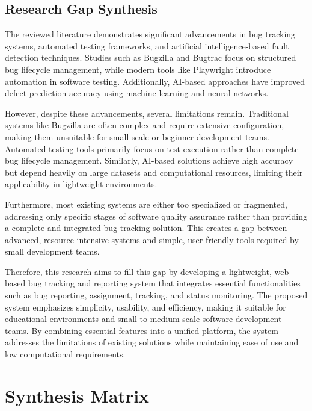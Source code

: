 \documentclass[12pt]{article}
\begin{document}
\subsection{Research Gap Synthesis}

The reviewed literature demonstrates significant advancements in bug tracking systems, automated testing frameworks, and artificial intelligence-based fault detection techniques. Studies such as Bugzilla and Bugtrac focus on structured bug lifecycle management, while modern tools like Playwright introduce automation in software testing. Additionally, AI-based approaches have improved defect prediction accuracy using machine learning and neural networks.

However, despite these advancements, several limitations remain. Traditional systems like Bugzilla are often complex and require extensive configuration, making them unsuitable for small-scale or beginner development teams. Automated testing tools primarily focus on test execution rather than complete bug lifecycle management. Similarly, AI-based solutions achieve high accuracy but depend heavily on large datasets and computational resources, limiting their applicability in lightweight environments.

Furthermore, most existing systems are either too specialized or fragmented, addressing only specific stages of software quality assurance rather than providing a complete and integrated bug tracking solution. This creates a gap between advanced, resource-intensive systems and simple, user-friendly tools required by small development teams.

Therefore, this research aims to fill this gap by developing a lightweight, web-based bug tracking and reporting system that integrates essential functionalities such as bug reporting, assignment, tracking, and status monitoring. The proposed system emphasizes simplicity, usability, and efficiency, making it suitable for educational environments and small to medium-scale software development teams. By combining essential features into a unified platform, the system addresses the limitations of existing solutions while maintaining ease of use and low computational requirements.

\section{Synthesis Matrix}
\end{document}

